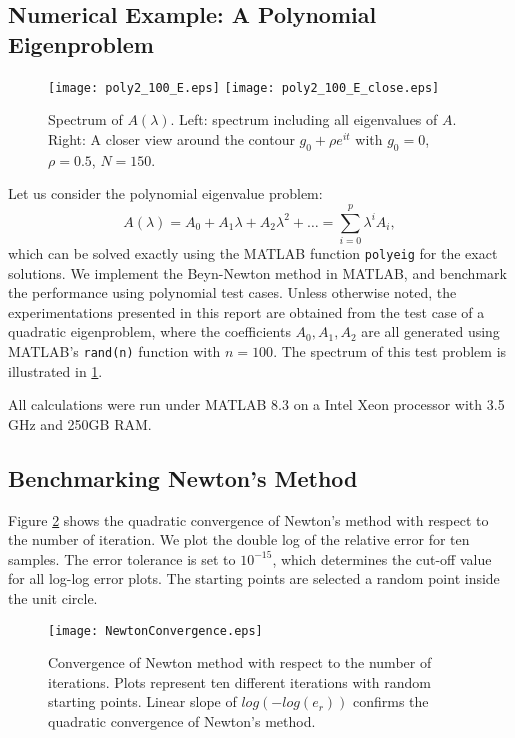 \documentclass[11pt,letterpaper]{article}
\begin{document}
\subsection{Numerical Example: A Polynomial Eigenproblem}
\begin{figure}\label{fig:E}
\begin{center}
\texttt{[image: poly2\_100\_E.eps]}
\texttt{[image: poly2\_100\_E\_close.eps]}
\end{center}
\caption{Spectrum of $A(\lambda)$. \textnormal{Left: spectrum including all eigenvalues of $A$. Right: A closer view around the contour $g_0+\rho e^{it}$ with $g_0=0$, $\rho=0.5$, $N=150$.}}
\end{figure}

Let us consider the polynomial eigenvalue problem:
\begin{equation}
\label{eq:polyeig}
A(\lambda)= A_0+A_1 \lambda + A_2 \lambda^2 + \ldots =\sum\limits_{i=0}^{p}\lambda^iA_i ,
\end{equation}
which can be solved exactly using the MATLAB function {\tt polyeig} for the exact solutions. We implement the Beyn-Newton method in MATLAB, and benchmark the performance using polynomial test cases. Unless otherwise noted, the experimentations presented in this report are obtained from the test case of a quadratic eigenproblem, where the coefficients $A_0, A_1, A_2$ are all generated using MATLAB's {\tt rand(n)} function with $n=100$. The spectrum of this test problem is illustrated in \ref{fig:E}. 

All calculations were run under MATLAB 8.3 on a Intel Xeon processor with 3.5 GHz and 250GB RAM. 
\subsection{Benchmarking Newton's Method}
Figure \ref{fig:NewtonBenchmark} shows the quadratic convergence of Newton's method with respect to the number of iteration. We plot the double log of the relative error for ten samples. The error tolerance is set to $10^{-15}$, which determines the cut-off value for all log-log error plots. The starting points are selected a random point inside the unit circle. 
\begin{figure}\label{fig:NewtonBenchmark}
\begin{center}
\texttt{[image: NewtonConvergence.eps]}
\end{center}
\caption{Convergence of Newton method with respect to the number of iterations. \textnormal{Plots represent ten different iterations with random starting points. Linear slope of $log(-log(e_r))$ confirms the quadratic convergence of Newton's method.}}
\end{figure}
\end{document}
